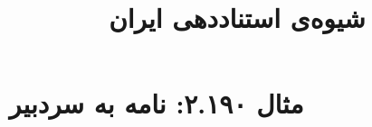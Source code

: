 \documentclass[a4paper,10pt]{article}
\begin{document}
\title{شیوه‌ی استناددهی ایران
 }
\author{}
\date{}
\maketitle



\section*{مثال ۲.۱۹۰: نامه به سردبیر}

\cite{روزبه1384}\\
\cite{clemens2000}\\






\end{document}
